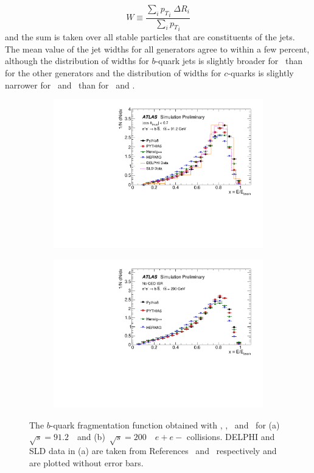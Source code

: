 $$
W \equiv \frac{\sum_{i} {p_{T}}_i \; \Delta R_{i}}{\sum_{i} {p_{T}}_i}
$$
\noindent
and the sum is taken over all stable particles that are constituents of the jets.    The mean value
of the jet widths for all generators agree to within a few percent, although the distribution of
widths for $b$-quark jets is slightly broader for \PythiaE\ than for the other generators and the
distribution of widths for $c$-quarks is slightly narrower for \Herwig\ and \Herwigpp\
than for \Pythia\ and \PythiaE.

\begin{figure}
\centering
\begin{subfigure}[]{0.45\textwidth}
\includegraphics[width=\textwidth]{evtgen/figures/Frag/LEP.pdf}
\end{subfigure}
\begin{subfigure}[]{0.45\textwidth}
\includegraphics[width=\textwidth]{evtgen/figures/Frag/200GeV/h_Xweak_B.pdf}
\end{subfigure}
\caption{The $b$-quark fragmentation function obtained 
with \PythiaE, \Pythia, \Herwigpp\ and \Herwig\  
for (a)~$\sqrt{s}=91.2$~\GeV\ and (b)~$\sqrt{s}=200$~\GeV\ $e+e-$ collisions. 
DELPHI and SLD data in (a) are taken from References~\cite{DELPHI} and~\cite{SLD} respectively and are plotted without error bars.  }
\label{fig:lepfrag}
\end{figure}


